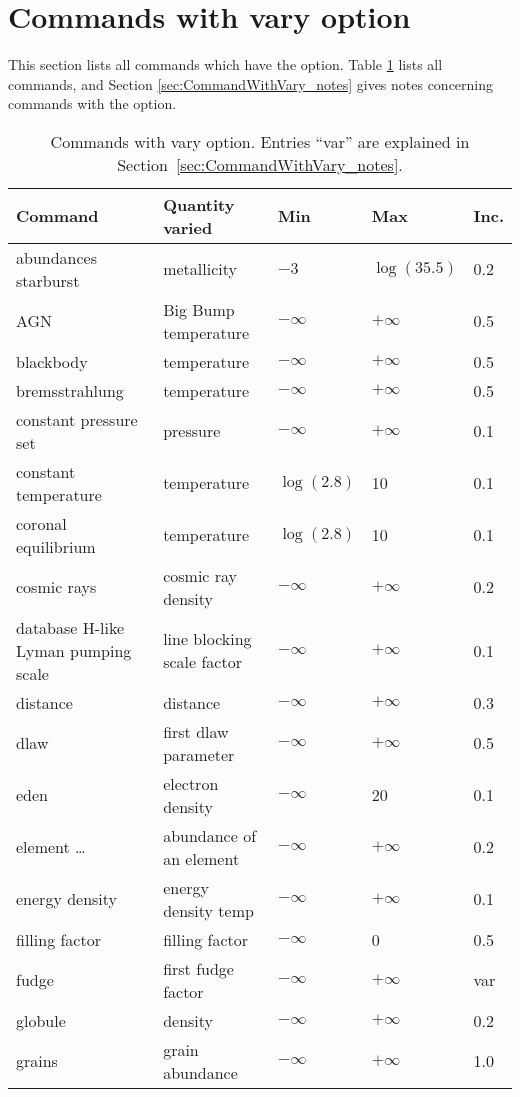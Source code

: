 \section{Commands with vary option}
\label{sec:CommandsVaryOption}

This section lists all commands which have the  option.
Table \ref{tab:CommandWithVaryOption} lists all commands, and
Section \ref{sec:CommandWithVary_notes} gives notes concerning commands 
with the  option.

\begin{table}
\centering
\caption{\label{tab:CommandWithVaryOption}Commands with vary option. Entries ``var'' are explained in Section~\ref{sec:CommandWithVary_notes}.}
\begin{tabular}{lllll}
\hline
Command& Quantity varied& Min& Max& Inc.\\
\hline
abundances starburst& metallicity& $-3$& $\log(35.5)$& 0.2\\
AGN& Big Bump temperature& $-\infty$& $+\infty$& 0.5\\
blackbody& temperature& $-\infty$& $+\infty$& 0.5\\
bremsstrahlung& temperature& $-\infty$& $+\infty$& 0.5\\
constant pressure set& pressure& $-\infty$& $+\infty$& 0.1\\
constant temperature& temperature& $\log(2.8)$& 10& 0.1\\
coronal equilibrium& temperature& $\log(2.8)$& 10& 0.1\\
cosmic rays& cosmic ray density& $-\infty$& $+\infty$& 0.2\\
database H-like Lyman pumping scale & line blocking scale factor& $-\infty$& $+\infty$& 0.1\\
distance& distance& $-\infty$& $+\infty$& 0.3\\
dlaw& first dlaw parameter& $-\infty$& $+\infty$& 0.5\\
eden& electron density& $-\infty$& 20 & 0.1\\
element \ldots& abundance of an element& $-\infty$& $+\infty$& 0.2\\
energy density& energy density temp& $-\infty$& $+\infty$& 0.1\\
filling factor& filling factor& $-\infty$& 0& 0.5\\
fudge& first fudge factor& $-\infty$& $+\infty$& var\\
globule& density& $-\infty$& $+\infty$& 0.2\\
grains& grain abundance& $-\infty$& $+\infty$& 1.0\\

\end{tabular}
\end{table}
